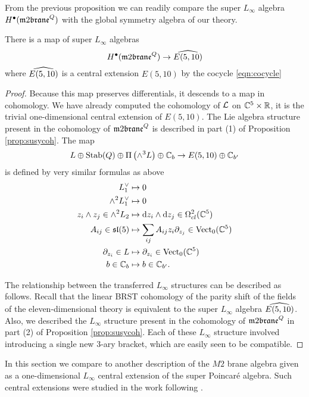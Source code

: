 \parsec[] From the previous proposition we can readily compare the super $L_\infty$ algebra $H^\bu(\m2^Q)$ with the global symmetry algebra of our theory.
\begin{cor}
There is a map of super $L_\infty$ algebras 
\[
H^\bu(\m2^Q)\to \Hat{E(5,10)}
\]
where $\Hat{E(5,10)}$ is a central extension $E(5,10)$ by the cocycle \eqref{eqn:cocycle}
\end{cor}
\begin{proof}
Because this map preserves differentials, it descends to a map in cohomology. 
We have already computed the cohomology of $\cL$ on $\CC^5 \times \RR$, it is the trivial one-dimensional central extension of $E (5,10)$. 
The Lie algebra structure present in the cohomology of $\m2^Q$ is described in part (1) of Proposition \ref{prop:susycoh}. 
The map
\[
L \oplus {\rm Stab}(Q) \oplus \Pi \left(\wedge^3 L \right) \oplus \CC_b \to E (5,10) \oplus \CC_{b'}
\]
is defined by very similar formulas as above
\begin{align*}
 L^\vee_1 & \mapsto 0 \\
 \wedge^2 L^\vee_1 & \mapsto 0 \\
z_i \wedge z_j \in \wedge^2 L_2 & \mapsto \d z_i \wedge \d z_j \in \Omega^{2}_{cl} (\CC^5) \\
A_{ij} \in \lie{sl}(5) & \mapsto \sum_{ij} A_{ij} z_i \partial_{z_j} \in \Vect_0(\CC^5) \\ \partial_{z_i} \in L & \mapsto
\partial_{z_i} \in \Vect_0(\CC^5) \\
b \in \CC_b & \mapsto b \in \CC_{b'} .
\end{align*}

The relationship between the transferred $L_\infty$ structures can be described as follows. 
Recall that the linear BRST cohomology of the parity shift of the fields of the eleven-dimensional theory is equivalent to the super $L_\infty$ 
algebra $\Hat{E(5,10)}$.
Also, we described the $L_\infty$ structure present in the cohomology of $\m2^Q$ in part (2) of Proposition \ref{prop:susycoh}. 
Each of these $L_\infty$ structure involved introducing a single new $3$-ary bracket, which are easily seen to be compatible. 
\end{proof}
\parsec[]

In this section we compare to another description of the $M2$ brane algebra given as a one-dimensional $L_\infty$ central extension of the super Poincar\'e algebra.
Such central extensions were studied in the work \cite{BHsusyII, SSS, FSS} following \cite{CDF}. 

